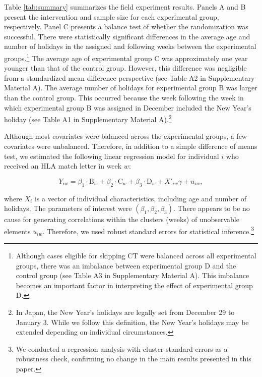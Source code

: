 \documentclass[12pt, a4paper]{article}
\begin{document}
Table \ref{tab:summary} summarizes the field experiment results. Panels A and B present the intervention and sample size for each experimental group, respectively. Panel C presents a balance test of whether the randomization was successful. There were statistically significant differences in the average age and number of holidays in the assigned and following weeks between the experimental groups.\footnote{Although cases eligible for skipping CT were balanced across all experimental groups, there was an imbalance between experimental group D and the control group (see Table A3 in Supplementary Material A). This imbalance becomes an important factor in interpreting the effect of experimental group D.} The average age of experimental group C was approximately one year younger than that of the control group. However, this difference was negligible from a standardized mean difference perspective (see Table A2 in Supplementary Material A). The average number of holidays for experimental group B was larger than the control group. This occurred because the week following the week in which experimental group B was assigned in December included the New Year's holiday (see Table A1 in Supplementary Material A).\footnote{In Japan, the New Year's holidays are legally set from December 29 to January 3. While we follow this definition, the New Year's holidays may be extended depending on individual circumstances.}

Although most covariates were balanced across the experimental groups, a few covariates were unbalanced. Therefore, in addition to a simple difference of means test, we estimated the following linear regression model for individual \(i\) who received an HLA match letter in week \(w\):

\begin{equation}
  Y_{iw} =
  \beta_1 \cdot \text{B}_{w} + \beta_2 \cdot \text{C}_{w} + \beta_3 \cdot \text{D}_{w}
  + X'_{iw} \gamma + u_{iw}, \label{eq:reg}
\end{equation}

\noindent
where \(X_i\) is a vector of individual characteristics, including age and number of holidays. The parameters of interest were \((\beta_1, \beta_2, \beta_3)\). There appears to be no cause for generating correlations within the clusters (weeks) of unobservable elements \(u_{iw}\). Therefore, we used robust standard errors for statistical inference.\footnote{We conducted a regression analysis with cluster standard errors as a robustness check, confirming no change in the main results presented in this paper.}
\end{document}
